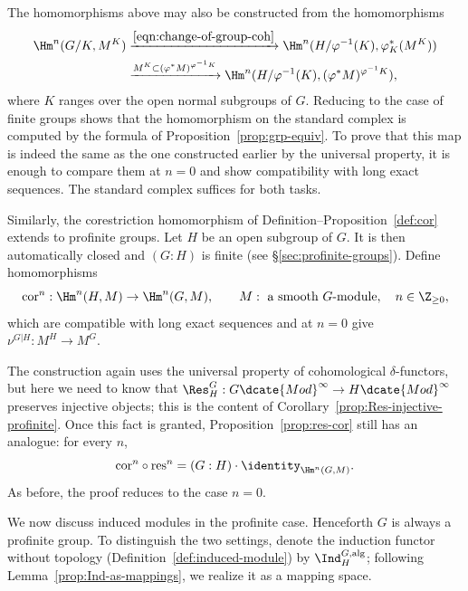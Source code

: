 The homomorphisms above may also be constructed from the homomorphisms
\begin{align*}
	\Hm^n(G/K,M^K)&\xrightarrow{\eqref{eqn:change-of-group-coh}}
	\Hm^n(H/\varphi^{-1}(K),\varphi_K^*(M^K))\\
	&\xrightarrow{M^K\subset(\varphi^*M)^{\varphi^{-1}K}}
	\Hm^n(H/\varphi^{-1}(K),(\varphi^*M)^{\varphi^{-1}K}),
\end{align*}
where $K$ ranges over the open normal subgroups of $G$. Reducing to the case
of finite groups shows that the homomorphism on the standard complex is
computed by the formula of Proposition~\ref{prop:grp-equiv}. To prove that
this map is indeed the same as the one constructed earlier by the universal
property, it is enough to compare them at $n=0$ and show compatibility with
long exact sequences. The standard complex suffices for both tasks.

Similarly, the corestriction homomorphism of
Definition--Proposition~\ref{def:cor} extends to profinite groups. Let $H$
be an open subgroup of $G$. It is then automatically closed and $(G:H)$ is
finite (see \S\ref{sec:profinite-groups}). Define homomorphisms
\[ \mathrm{cor}^n:\Hm^n(H,M)\to\Hm^n(G,M),\qquad
	M:\text{ a smooth $G$-module},\quad n\in\Z_{\geq0}, \]
which are compatible with long exact sequences and at $n=0$ give
$\nu^{G|H}:M^H\to M^G$.

The construction again uses the universal property of cohomological
$\delta$-functors, but here we need to know that
$\Res^G_H:G\dcate{Mod}^\infty\to H\dcate{Mod}^\infty$ preserves injective
objects; this is the content of
Corollary~\ref{prop:Res-injective-profinite}. Once this fact is granted,
Proposition~\ref{prop:res-cor} still has an analogue: for every $n$,
\[ \mathrm{cor}^n\circ\mathrm{res}^n
	=(G:H)\cdot\identity_{\Hm^n(G,M)}. \]
As before, the proof reduces to the case $n=0$.

We now discuss induced modules in the profinite case. Henceforth $G$ is
always a profinite group. To distinguish the two settings, denote the
induction functor without topology (Definition~\ref{def:induced-module}) by
$\Ind^{G,\mathrm{alg}}_H$; following Lemma~\ref{prop:Ind-as-mappings}, we
realize it as a mapping space.

